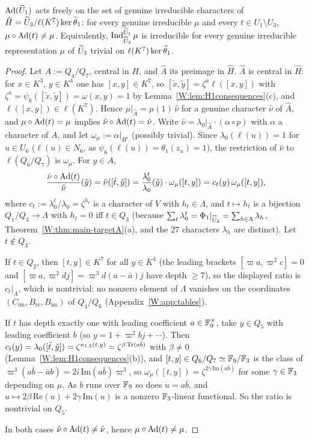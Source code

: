 \begin{proposition}\label{W:prop:free}
$\operatorname{Ad}(\widetilde U_1)$ acts freely on the set of genuine irreducible characters of
$\hat H=\widetilde U_3/\ell(K^7)\ker\widetilde\theta_1$: for every genuine irreducible $\mu$
and every $t\in U_1\setminus U_3$, $\mu\circ\operatorname{Ad}(t)\ne\mu$.
Equivalently, $\operatorname{Ind}_{\widetilde U_3}^{\widetilde U_1}\mu$ is irreducible for every genuine
irreducible representation $\mu$ of $\widetilde U_3$ trivial on
$\ell(K^7)\ker\widetilde\theta_1$.
\end{proposition}
\begin{proof}
Let $A:=Q_4/Q_7$, central in $H$, and $\hat A$ its preimage in $\hat H$.
$\hat A$ is central in $\hat H$: for $x\in K^3$, $y\in K^4$ one has
$[x,y]\in K^7$, so $[\tilde x,\tilde y]=\zeta^{a}\ell([x,y])$ with
$\zeta^a=\psi_6([\tilde x,\tilde y])=\omega(x,y)=1$ by
Lemma~\ref{W:lem:H1consequences}(c), and $\ell([x,y])\in\ell(K^7)$.  Hence
$\mu|_{\hat A}=\mu(1)\,\hat\nu$ for a genuine character $\hat\nu$ of
$\hat A$, and $\mu\circ\operatorname{Ad}(t)=\mu$ implies $\hat\nu\circ\operatorname{Ad}(t)=\hat\nu$.
Write $\hat\nu=\lambda_0|_{\hat A}\cdot(\alpha\circ p)$ with $\alpha$ a
character of $A$, and let $\omega_\mu:=\alpha|_{H'}$ (possibly trivial).
Since $\lambda_0(\ell(u))=1$ for $u\in U_6$ ($\ell(u)\in N_6$, as
$\psi_6(\ell(u))=\theta_1(z_u)=1$), the restriction of $\hat\nu$ to
$\ell(Q_6/Q_7)$ is $\omega_\mu$.  For $y\in A$,
\[
 \frac{\hat\nu\circ\operatorname{Ad}(t)}{\hat\nu}(\tilde y)=\hat\nu([\tilde t,\tilde y])
 =\frac{\lambda_0^t}{\lambda_0}(\tilde y)\cdot\omega_\mu([t,y])
 =c_t(y)\,\omega_\mu([t,y]),
\]
where $c_t:=\lambda_0^t/\lambda_0=\zeta^{h_t}$ is a character of $V$
with $h_t\in\Lambda$, and $t\mapsto h_t$ is a bijection
$Q_1/Q_3\to\Lambda$ with $h_t=0$ iff $t\in Q_3$ (because
$\sum_t\lambda_0^t=\Phi_1|_{\widetilde U_3}=\sum_{h\in\Lambda}\lambda_h$,
Theorem~\ref{W:thm:main-targetA}(a), and the $27$ characters $\lambda_h$
are distinct).  Let $t\notin Q_3$.

If $t\in Q_2$, then $[t,y]\in K^7$ for all $y\in K^4$ (the leading
brackets $[\varpi a,\varpi^2c]=0$ and $[\varpi a,\varpi^2dj]=\varpi^3d(a-\bar a)j$
have depth $\ge7$), so the displayed ratio is $c_t|_A$, which is
nontrivial: no nonzero element of $\Lambda$ vanishes on the coordinates
$(C_{\mathrm{im}},B_{\mathrm{re}},B_{\mathrm{im}})$ of $Q_4/Q_6$
(Appendix~\ref{W:app:tables}).

If $t$ has depth exactly one with leading coefficient $a\in\mathbb F_9^\times$,
take $y\in Q_5$ with leading coefficient $b$ (so $y=1+\varpi^2bj+\cdots$).
Then $c_t(y)=\lambda_0([\tilde t,\tilde y])=\zeta^{\kappa_{1,5}(t,y)}=\zeta^{\beta\operatorname{Tr}(a\bar b)}$
with $\beta\ne0$ (Lemma~\ref{W:lem:H1consequences}(b)), and $[t,y]\in Q_6/Q_7\simeq\mathbb F_9/\mathbb F_3$
is the class of $\varpi^3(a\bar b-\bar ab)=2i\,\mathrm{Im}(a\bar b)\varpi^3$,
so $\omega_\mu([t,y])=\zeta^{2\gamma\,\mathrm{Im}(a\bar b)}$ for some
$\gamma\in\mathbb F_3$ depending on $\mu$.  As $b$ runs over $\mathbb F_9$ so does
$u=a\bar b$, and $u\mapsto2\beta\,\mathrm{Re}(u)+2\gamma\,\mathrm{Im}(u)$ is
a nonzero $\mathbb F_3$-linear functional.  So the ratio is nontrivial on
$Q_5$.

In both cases $\hat\nu\circ\operatorname{Ad}(t)\ne\hat\nu$, hence $\mu\circ\operatorname{Ad}(t)\ne\mu$.
\end{proof}

